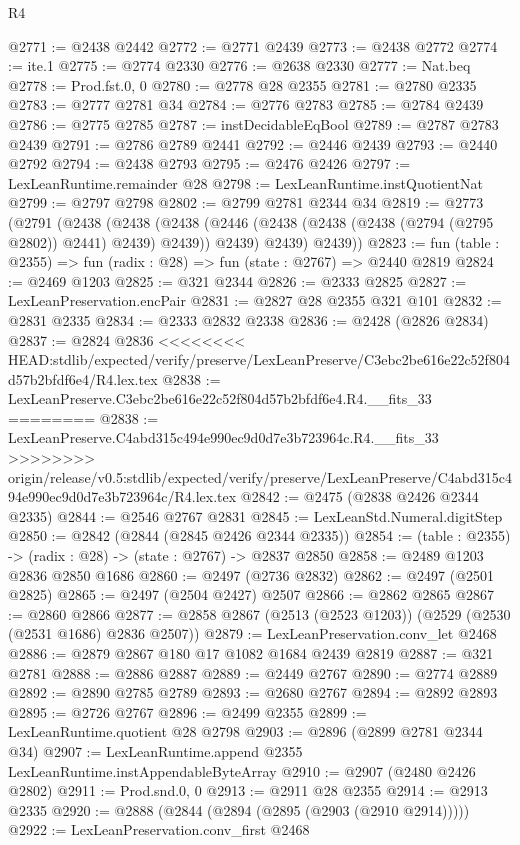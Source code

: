 \begin{lexlean}{R4}
\begin{coremodule}
{{{{{{{{{{{{{{{{{{{{{{{{{{{{{{{{{{{{{{{{{{{{{{{{{{{{{{{{{{{{{{{{{{{{{{{{{{{{{{{{{{{{{{{{{{{{@2771 := @2438 @2442
@2772 := @2771 @2439
@2773 := @2438 @2772
@2774 := ite.{1}
@2775 := @2774 @2330
@2776 := @2638 @2330
@2777 := Nat.beq
@2778 := Prod.fst.{0, 0}
@2780 := @2778 @28 @2355
@2781 := @2780 @2335
@2783 := @2777 @2781 @34
@2784 := @2776 @2783
@2785 := @2784 @2439
@2786 := @2775 @2785
@2787 := instDecidableEqBool
@2789 := @2787 @2783 @2439
@2791 := @2786 @2789 @2441
@2792 := @2446 @2439
@2793 := @2440 @2792
@2794 := @2438 @2793
@2795 := @2476 @2426
@2797 := LexLeanRuntime.remainder @28
@2798 := LexLeanRuntime.instQuotientNat
@2799 := @2797 @2798
@2802 := @2799 @2781 @2344 @34
@2819 := @2773
    (@2791
      (@2438
        (@2438
          (@2438 (@2446 (@2438 (@2438 (@2438 (@2794 (@2795 @2802)) @2441) @2439) @2439)) @2439)
          @2439)
        @2439))
@2823 := fun (table : @2355) => fun (radix : @28) => fun (state : @2767) => @2440 @2819
@2824 := @2469 @1203
@2825 := @321 @2344
@2826 := @2333 @2825
@2827 := LexLeanPreservation.encPair
@2831 := @2827 @28 @2355 @321 @101
@2832 := @2831 @2335
@2834 := @2333 @2832 @2338
@2836 := @2428 (@2826 @2834)
@2837 := @2824 @2836
<<<<<<<< HEAD:stdlib/expected/verify/preserve/LexLeanPreserve/C3ebc2be616e22c52f804d57b2bfdf6e4/R4.lex.tex
@2838 := LexLeanPreserve.C3ebc2be616e22c52f804d57b2bfdf6e4.R4.__fits_33
========
@2838 := LexLeanPreserve.C4abd315c494e990ec9d0d7e3b723964c.R4.__fits_33
>>>>>>>> origin/release/v0.5:stdlib/expected/verify/preserve/LexLeanPreserve/C4abd315c494e990ec9d0d7e3b723964c/R4.lex.tex
@2842 := @2475 (@2838 @2426 @2344 @2335)
@2844 := @2546 @2767 @2831
@2845 := LexLeanStd.Numeral.digitStep
@2850 := @2842 (@2844 (@2845 @2426 @2344 @2335))
@2854 := (table : @2355) -> (radix : @28) -> (state : @2767) -> @2837 @2850
@2858 := @2489 @1203 @2836 @2850 @1686
@2860 := @2497 (@2736 @2832)
@2862 := @2497 (@2501 @2825)
@2865 := @2497 (@2504 @2427) @2507
@2866 := @2862 @2865
@2867 := @2860 @2866
@2877 := @2858 @2867 (@2513 (@2523 @1203)) (@2529 (@2530 (@2531 @1686) @2836 @2507))
@2879 := LexLeanPreservation.conv_let @2468
@2886 := @2879 @2867 @180 @17 @1082 @1684 @2439 @2819
@2887 := @321 @2781
@2888 := @2886 @2887
@2889 := @2449 @2767
@2890 := @2774 @2889
@2892 := @2890 @2785 @2789
@2893 := @2680 @2767
@2894 := @2892 @2893
@2895 := @2726 @2767
@2896 := @2499 @2355
@2899 := LexLeanRuntime.quotient @28 @2798
@2903 := @2896 (@2899 @2781 @2344 @34)
@2907 := LexLeanRuntime.append @2355 LexLeanRuntime.instAppendableByteArray
@2910 := @2907 (@2480 @2426 @2802)
@2911 := Prod.snd.{0, 0}
@2913 := @2911 @28 @2355
@2914 := @2913 @2335
@2920 := @2888 (@2844 (@2894 (@2895 (@2903 (@2910 @2914)))))
@2922 := LexLeanPreservation.conv_first @2468
}}}}}}}}}}}}}}}}}}}}}}}}}}}}}}}}}}}}}}}}}}}}}}}}}}}}}}}}}}}}}}}}}}}}}}}}}}}}}}}}}}}}}}}}}}}}
\end{coremodule}
\end{lexlean}
